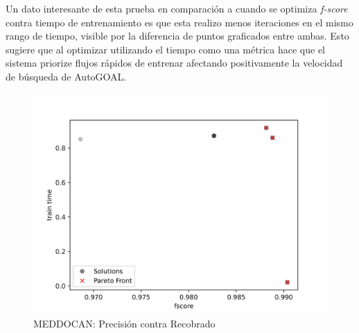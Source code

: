 Un dato interesante de esta prueba en comparaci\'on a cuando se optimiza \textit{f-score} contra tiempo de entrenamiento es que esta realizo menos iteraciones en el mismo rango de tiempo, visible por la diferencia de puntos graficados entre ambas. Esto sugiere que al optimizar utilizando el tiempo como una m\'etrica hace que el sistema priorize flujos r\'apidos de entrenar afectando positivamente la velocidad de b\'usqueda de AutoGOAL.

\begin{figure}[ht]
    \centering
    \includegraphics[scale=0.65]{Pictures/meddocan_precision_vs_recall.jpg}
    \caption{MEDDOCAN: Precisi\'on contra Recobrado}
    \label{impl:fig:MEDDOCAN:precision_vs_recall}
\end{figure}
